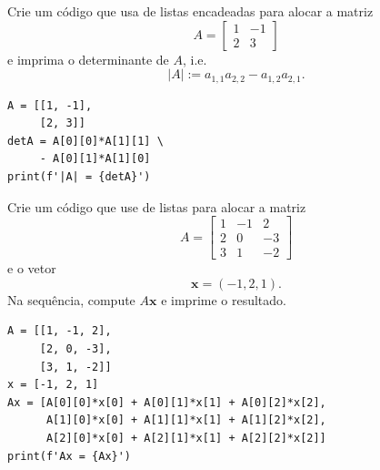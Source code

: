 \begin{exer}
  Crie um código que usa de listas encadeadas para alocar a matriz
  \begin{equation}
    A =
    \begin{bmatrix}
      1 & -1\\
      2 & 3
    \end{bmatrix}
  \end{equation}
  e imprima o determinante de $A$, i.e.
  \begin{equation}
    |A| := a_{1,1}a_{2,2} - a_{1,2}a_{2,1}.
  \end{equation}
\end{exer}
\begin{resp}
\begin{lstlisting}
A = [[1, -1],
     [2, 3]]
detA = A[0][0]*A[1][1] \
     - A[0][1]*A[1][0]
print(f'|A| = {detA}')
\end{lstlisting}
\end{resp}

\begin{exer}
  Crie um código que use de listas para alocar a matriz
  \begin{equation}
    A =
    \begin{bmatrix}
      1 & -1 & 2\\
      2 & 0 & -3\\
      3 & 1 & -2
    \end{bmatrix}
  \end{equation}
  e o vetor
  \begin{equation}
    \pmb{x} = (-1, 2, 1).
  \end{equation}
  Na sequência, compute $A\pmb{x}$ e imprime o resultado.
\end{exer}
\begin{resp}
\begin{lstlisting}
A = [[1, -1, 2],
     [2, 0, -3],
     [3, 1, -2]]
x = [-1, 2, 1]
Ax = [A[0][0]*x[0] + A[0][1]*x[1] + A[0][2]*x[2],
      A[1][0]*x[0] + A[1][1]*x[1] + A[1][2]*x[2],
      A[2][0]*x[0] + A[2][1]*x[1] + A[2][2]*x[2]]
print(f'Ax = {Ax}')
\end{lstlisting}
\end{resp}
